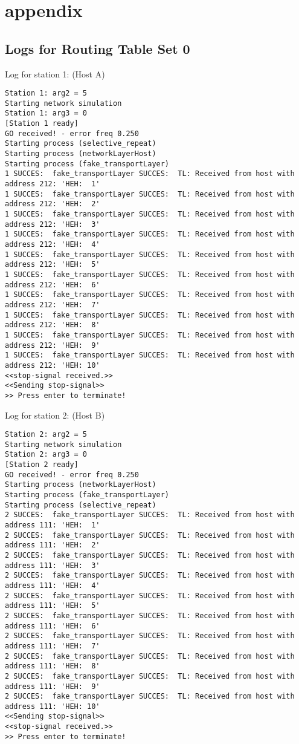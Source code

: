 \section{appendix}
\subsection{Logs for Routing Table Set 0}
Log for station 1: (Host A)
\begin{lstlisting}[breaklines=true]
Station 1: arg2 = 5
Starting network simulation
Station 1: arg3 = 0
[Station 1 ready]
GO received! - error freq 0.250
Starting process (selective_repeat)
Starting process (networkLayerHost)
Starting process (fake_transportLayer)
1 SUCCES:  fake_transportLayer SUCCES:  TL: Received from host with address 212: 'HEH:  1'
1 SUCCES:  fake_transportLayer SUCCES:  TL: Received from host with address 212: 'HEH:  2'
1 SUCCES:  fake_transportLayer SUCCES:  TL: Received from host with address 212: 'HEH:  3'
1 SUCCES:  fake_transportLayer SUCCES:  TL: Received from host with address 212: 'HEH:  4'
1 SUCCES:  fake_transportLayer SUCCES:  TL: Received from host with address 212: 'HEH:  5'
1 SUCCES:  fake_transportLayer SUCCES:  TL: Received from host with address 212: 'HEH:  6'
1 SUCCES:  fake_transportLayer SUCCES:  TL: Received from host with address 212: 'HEH:  7'
1 SUCCES:  fake_transportLayer SUCCES:  TL: Received from host with address 212: 'HEH:  8'
1 SUCCES:  fake_transportLayer SUCCES:  TL: Received from host with address 212: 'HEH:  9'
1 SUCCES:  fake_transportLayer SUCCES:  TL: Received from host with address 212: 'HEH: 10'
<<stop-signal received.>>
<<Sending stop-signal>>
>> Press enter to terminate!
\end{lstlisting}

Log for station 2: (Host B)
\begin{lstlisting}[breaklines=true]
Station 2: arg2 = 5
Starting network simulation
Station 2: arg3 = 0
[Station 2 ready]
GO received! - error freq 0.250
Starting process (networkLayerHost)
Starting process (fake_transportLayer)
Starting process (selective_repeat)
2 SUCCES:  fake_transportLayer SUCCES:  TL: Received from host with address 111: 'HEH:  1'
2 SUCCES:  fake_transportLayer SUCCES:  TL: Received from host with address 111: 'HEH:  2'
2 SUCCES:  fake_transportLayer SUCCES:  TL: Received from host with address 111: 'HEH:  3'
2 SUCCES:  fake_transportLayer SUCCES:  TL: Received from host with address 111: 'HEH:  4'
2 SUCCES:  fake_transportLayer SUCCES:  TL: Received from host with address 111: 'HEH:  5'
2 SUCCES:  fake_transportLayer SUCCES:  TL: Received from host with address 111: 'HEH:  6'
2 SUCCES:  fake_transportLayer SUCCES:  TL: Received from host with address 111: 'HEH:  7'
2 SUCCES:  fake_transportLayer SUCCES:  TL: Received from host with address 111: 'HEH:  8'
2 SUCCES:  fake_transportLayer SUCCES:  TL: Received from host with address 111: 'HEH:  9'
2 SUCCES:  fake_transportLayer SUCCES:  TL: Received from host with address 111: 'HEH: 10'
<<Sending stop-signal>>
<<stop-signal received.>>
>> Press enter to terminate!
\end{lstlisting}

